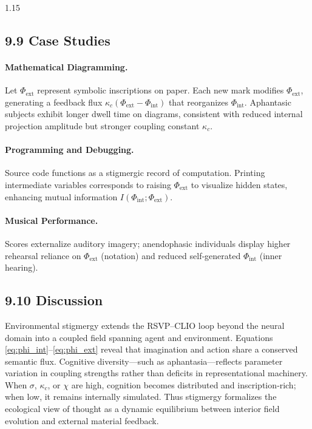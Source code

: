 \documentclass[12pt,a4paper]{article}
\begin{document}
\begin{spacing}{1.15}
\subsection{9.9 Case Studies}

\paragraph{Mathematical Diagramming.}
Let $\Phi_{\mathrm{ext}}$ represent symbolic inscriptions on paper.  
Each new mark modifies $\Phi_{\mathrm{ext}}$, generating a feedback flux  
$\kappa_c(\Phi_{\mathrm{ext}}-\Phi_{\mathrm{int}})$  
that reorganizes $\Phi_{\mathrm{int}}$.  
Aphantasic subjects exhibit longer dwell time on diagrams, consistent with reduced internal projection amplitude but stronger coupling constant $\kappa_c$.

\paragraph{Programming and Debugging.}
Source code functions as a stigmergic record of computation.  
Printing intermediate variables corresponds to raising $\Phi_{\mathrm{ext}}$ to visualize hidden states, enhancing mutual information $I(\Phi_{\mathrm{int}};\Phi_{\mathrm{ext}})$.

\paragraph{Musical Performance.}
Scores externalize auditory imagery; anendophasic individuals display higher rehearsal reliance on $\Phi_{\mathrm{ext}}$ (notation) and reduced self‐generated $\Phi_{\mathrm{int}}$ (inner hearing).

\subsection{9.10 Discussion}

Environmental stigmergy extends the RSVP–CLIO loop beyond the neural domain into a coupled field spanning agent and environment.  
Equations \eqref{eq:phi_int}–\eqref{eq:phi_ext} reveal that imagination and action share a conserved semantic flux.  
Cognitive diversity—such as aphantasia—reflects parameter variation in coupling strengths rather than deficits in representational machinery.  
When $\sigma$, $\kappa_c$, or $\chi$ are high, cognition becomes distributed and inscription‐rich; when low, it remains internally simulated.  
Thus stigmergy formalizes the ecological view of thought as a dynamic equilibrium between interior field evolution and external material feedback.


\end{spacing}
\end{document}
